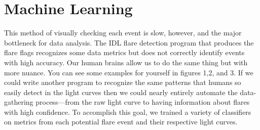\documentclass[11pt]{article}
\begin{document}
\section{Machine Learning}
\label{sec:ml}

This method of visually checking each event is slow, however, and the
major bottleneck for data analysis. The IDL flare detection program
that produces the flare flags recognizes some data metrics but does
not correctly identify events with high accuracy.  Our human brains
allow us to do the same thing but with more nuance.  You can see some
examples for yourself in figures 1,2, and 3.  If we could write
another program to recognize the same patterns that humans so easily
detect in the light curves then we could nearly entirely automate the
data-gathering process---from the raw light curve to having
information about flares with high confidence.  To accomplish this
goal, we trained a variety of classifiers on metrics from each
potential flare event and their respective light curves.

\end{document}
